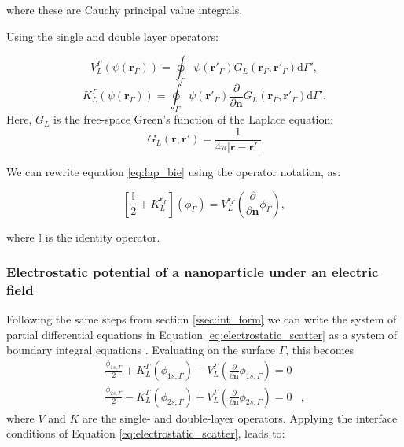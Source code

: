 where these are Cauchy principal value integrals.

Using the single and double layer operators:

\begin{equation}\label{eq:single_layer}
   V^{\Gamma}_L (\psi(\mathbf{r}_\Gamma)) = \oint_\Gamma \psi(\mathbf{r}'_\Gamma) G_L(\mathbf{r}_\Gamma, \mathbf{r}'_\Gamma) \text{d} \Gamma',
   \end{equation}
   \begin{equation}\label{eq:double_layer}
   K^{\Gamma}_L (\psi(\mathbf{r}_\Gamma)) = \oint_\Gamma \psi(\mathbf{r}'_\Gamma) \frac{\partial}{\partial \mathbf{n}}G_L(\mathbf{r}_\Gamma, \mathbf{r}'_\Gamma) \text{d} \Gamma'.
   \end{equation}
   Here, $G_L$ is the free-space Green's function of the Laplace equation:
   \begin{equation}
   G_L(\mathbf{r},\mathbf{r}') = \frac{1}{4\pi|\mathbf{r}-\mathbf{r}'|}
   \end{equation}
   

We can rewrite equation \eqref{eq:lap_bie} using the operator notation, as:

\begin{equation} \label{eq:lap_operator}
\left[ \frac{\mathbb{I}}{2} + K_L^{\mathbf{r}_\Gamma} \right] \left( \phi_\Gamma \right) = V_L^{\mathbf{r}_\Gamma} \left( \frac{\partial}{\partial \mathbf{n}} \phi_\Gamma \right),
\end{equation}

where $\mathbb{I}$ is the identity operator.

\subsubsection{Electrostatic potential of a nanoparticle under an electric field} \label{sec:pot_elec_field}

Following the same steps from section \ref{ssec:int_form}  we can write the system of partial differential equations 
in Equation \eqref{eq:electrostatic_scatter} as a system of boundary integral equations \cite{BrebbiaDominguez1992}. Evaluating on the surface $\Gamma$, this
becomes
%
\begin{align} \label{eq:integral_eq_lspr_nobc}
\frac{\phi_{1s,\Gamma}}{2}+ K_{L}^{\Gamma}(\phi_{1s,\Gamma}) - V_{L}^{\Gamma} \left(\frac{\partial}{\partial \mathbf{n}}\phi_{1s,\Gamma} \right) = 0&  \nonumber \\
\frac{\phi_{2s,\Gamma}}{2} - K_{L}^{\Gamma}(\phi_{2s,\Gamma}) + V_{L}^{\Gamma} \left( \frac{\partial}{\partial \mathbf{n}} \phi_{2s,\Gamma} \right) = 0&,
\end{align}
%
where $V$ and $K$ are the single- and double-layer operators.
%
Applying the interface conditions of Equation \eqref{eq:electrostatic_scatter},
leads to:

